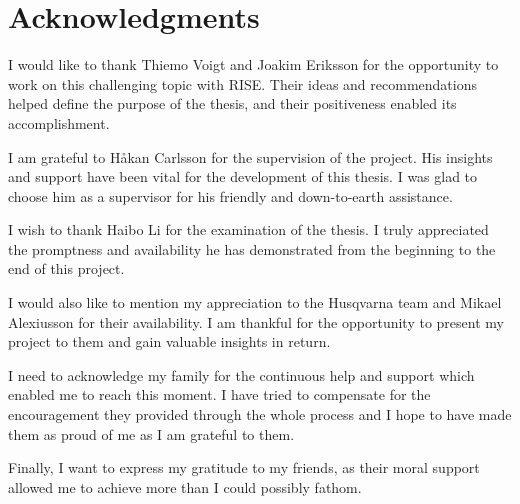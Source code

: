 
\section*{Acknowledgments }


\noindent I would like to thank Thiemo Voigt and Joakim Eriksson for the opportunity to work on this challenging topic with RISE.
Their ideas and recommendations helped define the purpose of the thesis, and their positiveness enabled its accomplishment.

I am grateful to Håkan Carlsson for the supervision of the project.
His insights and support have been vital for the development of this thesis.
I was glad to choose him as a supervisor for his friendly and down-to-earth assistance.

I wish to thank Haibo Li for the examination of the thesis.
I truly appreciated the promptness and availability he has demonstrated from the beginning to the end of this project.

I would also like to mention my appreciation to the Husqvarna team and Mikael Alexiusson for their availability.
I am thankful for the opportunity to present my project to them and gain valuable insights in return.

I need to acknowledge my family for the continuous help and support which enabled me to reach this moment.
I have tried to compensate for the encouragement they provided through the whole process and I hope to have made them as proud of me as I am grateful to them.

Finally, I want to express my gratitude to my friends, as their moral support allowed me to achieve more than I could possibly fathom. 

\acknowlegmentssignature
